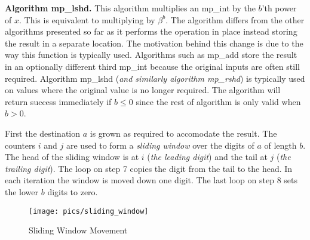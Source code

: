 \documentclass[b5paper]{book}
\begin{document}
\textbf{Algorithm mp\_lshd.}
This algorithm multiplies an mp\_int by the $b$'th power of $x$.  This is equivalent to multiplying by $\beta^b$.  The algorithm differs 
from the other algorithms presented so far as it performs the operation in place instead storing the result in a separate location.  The
motivation behind this change is due to the way this function is typically used.  Algorithms such as mp\_add store the result in an optionally
different third mp\_int because the original inputs are often still required.  Algorithm mp\_lshd (\textit{and similarly algorithm mp\_rshd}) is
typically used on values where the original value is no longer required.  The algorithm will return success immediately if 
$b \le 0$ since the rest of algorithm is only valid when $b > 0$.  

First the destination $a$ is grown as required to accomodate the result.  The counters $i$ and $j$ are used to form a \textit{sliding window} over
the digits of $a$ of length $b$.  The head of the sliding window is at $i$ (\textit{the leading digit}) and the tail at $j$ (\textit{the trailing digit}).  
The loop on step 7 copies the digit from the tail to the head.  In each iteration the window is moved down one digit.   The last loop on 
step 8 sets the lower $b$ digits to zero.

\newpage
\begin{center}
\begin{figure}[here]
\texttt{[image: pics/sliding\_window]}
\caption{Sliding Window Movement}
\end{figure}
\end{center}
\end{document}
